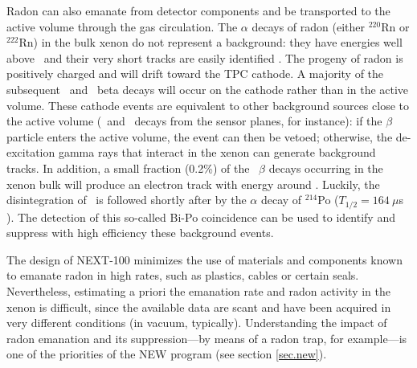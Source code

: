 Radon can also emanate from detector components and be transported to the active volume through the gas circulation. The $\alpha$ decays of radon (either $^{220}$Rn or $^{222}$Rn) in the bulk xenon do not represent a background: they have energies well above \Qbb\ and their very short tracks are easily identified \cite{Alvarez:2012hu}. The progeny of radon is positively charged and will drift toward the TPC cathode. A majority of the subsequent \Bi\ and \Tl\ beta decays will occur on the cathode rather than in the active volume. These cathode events are equivalent to other background sources close to the active volume (\Tl\ and \Bi\ decays from the sensor planes, for instance): if the $\beta$ particle enters the active volume, the event can then be vetoed; otherwise, the de-excitation gamma rays that interact in the xenon can generate background tracks. In addition, a small fraction (0.2\%) of the \Bi\ $\beta$ decays occurring in the xenon bulk will produce an electron track with energy around \Qbb. Luckily, the disintegration of \Bi\ is followed shortly after by the $\alpha$ decay of $^{214}$Po ($T_{1/2} = 164~\mu$s \cite{Wu:2012nds}). The detection of this so-called Bi-Po coincidence can be used to identify and suppress with high efficiency these background events.

The design of NEXT-100 minimizes the use of materials and components known to emanate radon in high rates, such as plastics, cables or certain seals. Nevertheless, estimating a priori the emanation rate and radon activity in the xenon is difficult, since the available data are scant and have been acquired in very different conditions (in vacuum, typically). Understanding the impact of radon emanation and its suppression---by means of a radon trap, for example---is one of the priorities of the NEW program (see section \ref{sec.new}).
